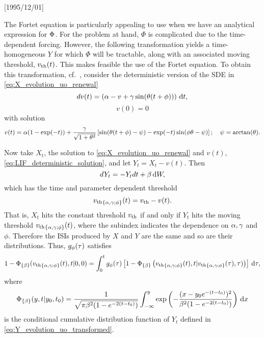 \NeedsTeXFormat{LaTeX2e}[1995/12/01] \documentclass[10pt]{bmc_article}
\newenvironment{bmcformat}{\begin{raggedright}\baselineskip20pt\sloppy\setboolean{publ}{false}}{\end{raggedright}\baselineskip20pt\sloppy}
\begin{document}
\begin{bmcformat}
The Fortet equation is particularly appealing to use when we have an analytical
expression for ${\Phi}$. For the problem at hand, $\Phi$ is complicated
due to the time-dependent forcing. However, the following transformation yields
a time-homogeneous $Y$ for which $\Phi$ will be tractable, along with an associated
moving threshold, ${ v_{\textrm{th} } }(t)$. This makes feasible
the use of the Fortet equation. To obtain this transformation, cf.\
\cite{Shimokawa1999}, consider the deterministic version of the SDE in
\cref{eq:X_evolution_uo_renewal} 
\begin{equation}
dv(t) = \left( {\alpha} - v + {\gamma } \sin({\theta} (t + \phi) ) \right) \, \mathrm{d} t,
\label{eq:LIF_deterministic}
\end{equation}
$$v(0) = 0
$$
with solution
\begin{equation}
v(t) = {\alpha}( 1- \exp(-t)) 
  + \frac{{\gamma }}{\sqrt{1+{\theta}^2}} 
\left[  \sin({\theta}(t + \phi) - \psi )
 - \exp(-t)\sin(\phi{\theta} - \psi ) \right]; \quad  
\psi = \arctan({\theta}).
\label{eq:LIF_deterministic_solution}
\end{equation}

Now take $X_t$, the solution to \cref{eq:X_evolution_uo_renewal} and
$v(t)$, \cref{eq:LIF_deterministic_solution}, and 
let $Y_t = X_t - v(t)$. Then
\begin{equation}
dY_t = -Y_t dt + {\beta} \, \mathrm{d} W,
\label{eq:Y_evolution_uo_transformed}
\end{equation}
which has the time and parameter dependent threshold
\begin{equation}
{ v_{\textrm{th} } }_{\{{\alpha},{\gamma };\phi\}}(t) = { v_{\textrm{th} } } - v(t).
\end{equation}
That is, $X_t$ hits the constant threshold ${ v_{\textrm{th} } }$ if and only if $Y_t$ hits the
moving threshold ${ v_{\textrm{th} } }_{\{{\alpha},{\gamma };\phi\}}(t)$, where the subindex
indicates the dependence on ${\alpha},{\gamma }$ and $\phi$. Therefore the ISIs produced by $X$ and $Y$
are the same and so are their distributions. Thus, $g_\phi({\tau})$ satisfies
\begin{equation}
1 - {\Phi}_{\{{\beta}\}}({ v_{\textrm{th} } }_{\{{\alpha},{\gamma };\phi\}} (t), t|0, 0) =
\int_0^t g_{\phi} (\tau)
\left[1-{\Phi}_{\{{\beta}\}} \left({ v_{\textrm{th} } }_{\{{\alpha},{\gamma };\phi\}} (t),  t|
						  { v_{\textrm{th} } }_{\{{\alpha},{\gamma };\phi\}} ({\tau}), {\tau} ) \right)
      \right] \, \mathrm{d} {\tau},
\label{eq:Fortet_moving_vth}
\end{equation}
where 
$$
{\Phi}_{\{{\beta}\}}(y,t| y_0, t_0) = \frac{1}{ \sqrt{\pi {\beta}^2(1-e^{-2(t-t_0)}) }}
\int_{-\infty}^{y} \exp \left( -\frac{(x - y_0e^{-(t-t_0)})^2}
							         {{\beta}^2(1-e^{-2(t-t_0)})} \right) \, \mathrm{d} x
$$
is the conditional cumulative distribution function of $Y_t$ defined in
\cref{eq:Y_evolution_uo_transformed}.


\end{bmcformat}
\end{document}
